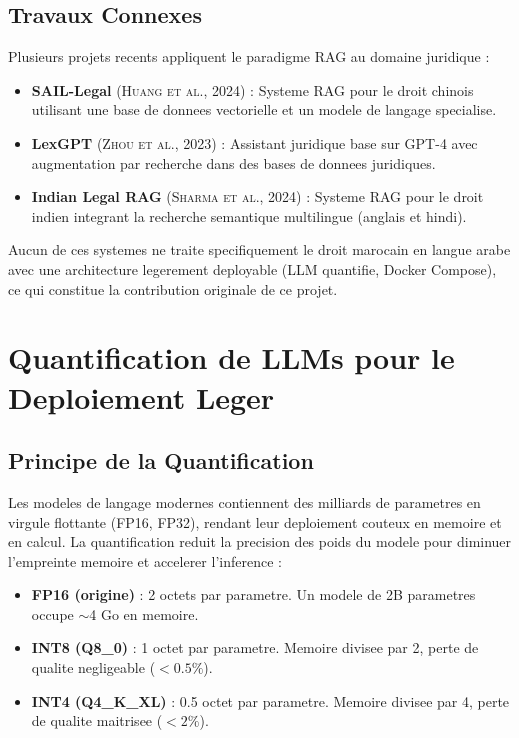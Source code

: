 \subsection{Travaux Connexes}

Plusieurs projets recents appliquent le paradigme RAG au domaine juridique :

\begin{itemize}
    \item \textbf{SAIL-Legal} (\textsc{Huang et al.}, 2024) : Systeme RAG pour le droit chinois utilisant une base de donnees vectorielle et un modele de langage specialise.
    
    \item \textbf{LexGPT} (\textsc{Zhou et al.}, 2023) : Assistant juridique base sur GPT-4 avec augmentation par recherche dans des bases de donnees juridiques.
    
    \item \textbf{Indian Legal RAG} (\textsc{Sharma et al.}, 2024) : Systeme RAG pour le droit indien integrant la recherche semantique multilingue (anglais et hindi).
\end{itemize}

Aucun de ces systemes ne traite specifiquement le droit marocain en langue arabe avec une architecture legerement deployable (LLM quantifie, Docker Compose), ce qui constitue la contribution originale de ce projet.

\section{Quantification de LLMs pour le Deploiement Leger}

\subsection{Principe de la Quantification}

Les modeles de langage modernes contiennent des milliards de parametres en virgule flottante (FP16, FP32), rendant leur deploiement couteux en memoire et en calcul. La quantification reduit la precision des poids du modele pour diminuer l'empreinte memoire et accelerer l'inference :

\begin{itemize}
    \item \textbf{FP16 (origine)} : 2 octets par parametre. Un modele de 2B parametres occupe $\sim$4 Go en memoire.
    \item \textbf{INT8 (Q8\_0)} : 1 octet par parametre. Memoire divisee par 2, perte de qualite negligeable ($< 0.5\%$).
    \item \textbf{INT4 (Q4\_K\_XL)} : 0.5 octet par parametre. Memoire divisee par 4, perte de qualite maitrisee ($< 2\%$).
\end{itemize}

